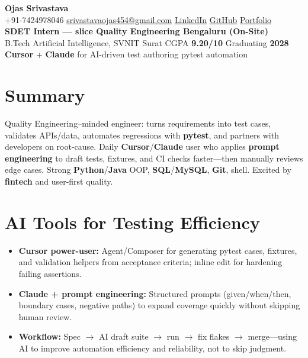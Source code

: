 \documentclass[a4paper,10pt]{article}
\begin{document}
\selectfont

\begin{center}
  {\LARGE \textbf{Ojas Srivastava}} \\[0.55mm]
  \small
  +91-7424978046 \textbar{}
  \href{mailto:srivastavaojas454@gmail.com}{srivastavaojas454@gmail.com} \textbar{}
  \href{https://linkedin.com/in/ojas-srivastava05}{LinkedIn} \textbar{}
  \href{https://github.com/Ojas-Srivastava05}{GitHub} \textbar{}
  \href{https://ojas-srivastava.vercel.app}{Portfolio} \\[0.2mm]
  \textbf{SDET Intern --- slice Quality Engineering \textbar{} Bengaluru (On-Site)} \\[0.1mm]
  B.Tech Artificial Intelligence, SVNIT Surat \textbar{} CGPA \textbf{9.20/10} \textbar{} Graduating \textbf{2028} \\[0.1mm]
  \textbf{Cursor} + \textbf{Claude} for AI-driven test authoring \textbar{} pytest automation
\end{center}

\vspace{-0.5mm}

\section{Summary}
\small
Quality Engineering--minded engineer: turns requirements into test cases, validates APIs/data, automates regressions with \textbf{pytest}, and partners with developers on root-cause. Daily \textbf{Cursor}/\textbf{Claude} user who applies \textbf{prompt engineering} to draft tests, fixtures, and CI checks faster---then manually reviews edge cases. Strong \textbf{Python}/\textbf{Java} OOP, \textbf{SQL}/\textbf{MySQL}, \textbf{Git}, shell. Excited by \textbf{fintech} and user-first quality.

\section{AI Tools for Testing Efficiency}
\small
\begin{itemize}
  \item \textbf{Cursor power-user:} Agent/Composer for generating pytest cases, fixtures, and validation helpers from acceptance criteria; inline edit for hardening failing assertions.
  \item \textbf{Claude + prompt engineering:} Structured prompts (given/when/then, boundary cases, negative paths) to expand coverage quickly without skipping human review.
  \item \textbf{Workflow:} Spec $\rightarrow$ AI draft suite $\rightarrow$ run $\rightarrow$ fix flakes $\rightarrow$ merge---using AI to improve automation efficiency and reliability, not to skip judgment.
\end{itemize}
\end{document}
